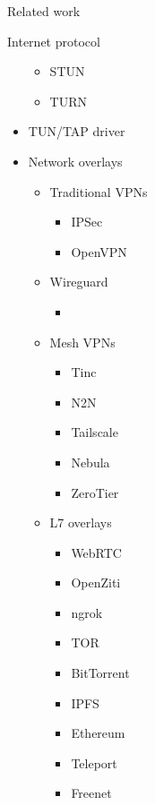 \begin{frame}[fragile]{Related work}
\begin{block}{Internet protocol}
\begin{itemize}
  \begin{itemize}
  \tightlist
  \item
    STUN
  \item
    TURN
  \end{itemize}
\item
  TUN/TAP driver
\item
  Network overlays

  \begin{itemize}
  \tightlist
  \item
    Traditional VPNs

    \begin{itemize}
    \tightlist
    \item
      IPSec
    \item
      OpenVPN
    \end{itemize}
  \item
    Wireguard

    \begin{itemize}
    \tightlist
    \item
    \end{itemize}
  \item
    Mesh VPNs

    \begin{itemize}
    \tightlist
    \item
      Tinc
    \item
      N2N
    \item
      Tailscale
    \item
      Nebula
    \item
      ZeroTier
    \end{itemize}
  \item
    L7 overlays

    \begin{itemize}
    \tightlist
    \item
      WebRTC
    \item
      OpenZiti
    \item
      ngrok
    \item
      TOR
    \item
      BitTorrent
    \item
      IPFS
    \item
      Ethereum
    \item
      Teleport
    \item
      Freenet
    \end{itemize}
  \end{itemize}
\end{itemize}
\end{block}


\end{frame}

